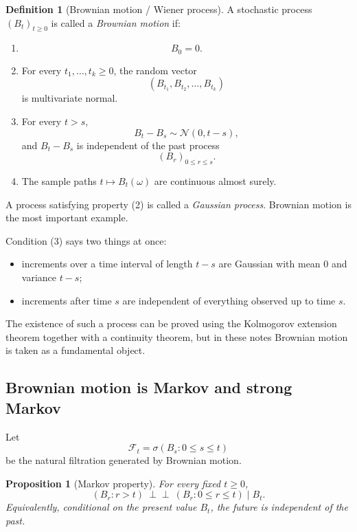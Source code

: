 \documentclass[11pt]{article}
\newtheorem{proposition}[theorem]{Proposition}
\theoremstyle{definition}
\newtheorem{definition}[theorem]{Definition}
\begin{document}
\begin{definition}[Brownian motion / Wiener process]
A stochastic process \((B_t)_{t\ge 0}\) is called a \emph{Brownian motion} if:
\begin{enumerate}[label=\arabic*.]
    \item
    \[
    B_0=0.
    \]
    \item For every \(t_1,\dots,t_k\ge 0\), the random vector
    \[
    (B_{t_1},B_{t_2},\dots,B_{t_k})
    \]
    is multivariate normal.
    \item For every \(t>s\),
    \[
    B_t-B_s\sim \mathcal N(0,t-s),
    \]
    and \(B_t-B_s\) is independent of the past process
    \[
    (B_r)_{0\le r\le s}.
    \]
    \item The sample paths \(t\mapsto B_t(\omega)\) are continuous almost surely.
\end{enumerate}
\end{definition}

A process satisfying property (2) is called a \emph{Gaussian process}. Brownian motion is the most important example.

Condition (3) says two things at once:
\begin{itemize}[leftmargin=2em]
    \item increments over a time interval of length \(t-s\) are Gaussian with mean \(0\) and variance \(t-s\);
    \item increments after time \(s\) are independent of everything observed up to time \(s\).
\end{itemize}

The existence of such a process can be proved using the Kolmogorov extension theorem together with a continuity theorem, but in these notes Brownian motion is taken as a fundamental object.

\subsection{Brownian motion is Markov and strong Markov}

Let
\[
\mathcal F_t=\sigma(B_s:0\le s\le t)
\]
be the natural filtration generated by Brownian motion.

\begin{proposition}[Markov property]
For every fixed \(t\ge 0\),
\[
(B_r:r>t)\ \perp\!\!\!\perp\ (B_r:0\le r\le t)\mid B_t.
\]
Equivalently, conditional on the present value \(B_t\), the future is independent of the past.
\end{proposition}
\end{document}
